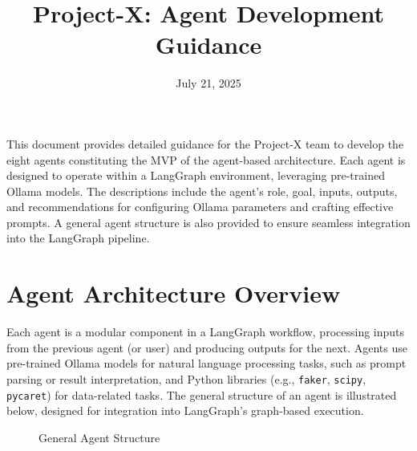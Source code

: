 \documentclass{article}
\title{Project-X: Agent Development Guidance}
\author{}
\date{July 21, 2025}
\begin{document}
\maketitle

This document provides detailed guidance for the Project-X team to develop the eight agents constituting the MVP of the agent-based architecture. Each agent is designed to operate within a LangGraph environment, leveraging pre-trained Ollama models. The descriptions include the agent’s role, goal, inputs, outputs, and recommendations for configuring Ollama parameters and crafting effective prompts. A general agent structure is also provided to ensure seamless integration into the LangGraph pipeline.

\section{Agent Architecture Overview}

Each agent is a modular component in a LangGraph workflow, processing inputs from the previous agent (or user) and producing outputs for the next. Agents use pre-trained Ollama models for natural language processing tasks, such as prompt parsing or result interpretation, and Python libraries (e.g., \texttt{faker}, \texttt{scipy}, \texttt{pycaret}) for data-related tasks. The general structure of an agent is illustrated below, designed for integration into LangGraph’s graph-based execution.

\begin{figure}[h]
\centering
{}
\caption{General Agent Structure}
\end{figure}
\end{document}
